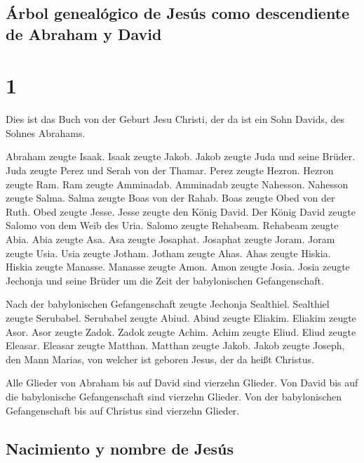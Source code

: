 \hypertarget{uxe1rbol-genealuxf3gico-de-jesuxfas-como-descendiente-de-abraham-y-david}{%
\subsection{Árbol genealógico de Jesús como descendiente de Abraham y
David}\label{uxe1rbol-genealuxf3gico-de-jesuxfas-como-descendiente-de-abraham-y-david}}

\hypertarget{section}{%
\section{1}\label{section}}

 Dies ist das Buch von der Geburt Jesu Christi, der da ist
ein Sohn Davids, des Sohnes Abrahams.

 Abraham zeugte Isaak. Isaak zeugte Jakob. Jakob zeugte
Juda und seine Brüder.  Juda zeugte Perez und Serah von
der Thamar. Perez zeugte Hezron. Hezron zeugte Ram.  Ram
zeugte Amminadab. Amminadab zeugte Nahesson. Nahesson zeugte Salma.
 Salma zeugte Boas von der Rahab. Boas zeugte Obed von der
Ruth. Obed zeugte Jesse.  Jesse zeugte den König David.
Der König David zeugte Salomo von dem Weib des Uria. 
Salomo zeugte Rehabeam. Rehabeam zeugte Abia. Abia zeugte Asa.
 Asa zeugte Josaphat. Josaphat zeugte Joram. Joram zeugte
Usia.  Usia zeugte Jotham. Jotham zeugte Ahas. Ahas zeugte
Hiskia.  Hiskia zeugte Manasse. Manasse zeugte Amon. Amon
zeugte Josia.  Josia zeugte Jechonja und seine Brüder um
die Zeit der babylonischen Gefangenschaft.

 Nach der babylonischen Gefangenschaft zeugte Jechonja
Sealthiel. Sealthiel zeugte Serubabel.  Serubabel zeugte
Abiud. Abiud zeugte Eliakim. Eliakim zeugte Asor.  Asor
zeugte Zadok. Zadok zeugte Achim. Achim zeugte Eliud. 
Eliud zeugte Eleasar. Eleasar zeugte Matthan. Matthan zeugte Jakob.
 Jakob zeugte Joseph, den Mann Marias, von welcher ist
geboren Jesus, der da heißt Christus.

 Alle Glieder von Abraham bis auf David sind vierzehn
Glieder. Von David bis auf die babylonische Gefangenschaft sind vierzehn
Glieder. Von der babylonischen Gefangenschaft bis auf Christus sind
vierzehn Glieder.

\hypertarget{nacimiento-y-nombre-de-jesuxfas}{%
\subsection{Nacimiento y nombre de
Jesús}\label{nacimiento-y-nombre-de-jesuxfas}}

